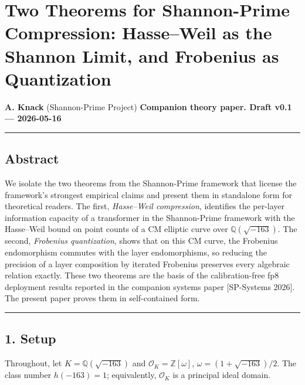 \documentclass[
  11pt,
]{article}
\author{}
\date{}
\begin{document}
\hypertarget{two-theorems-for-shannon-prime-compression-hasseweil-as-the-shannon-limit-and-frobenius-as-quantization}{%
\section{Two Theorems for Shannon-Prime Compression: Hasse--Weil as the
Shannon Limit, and Frobenius as
Quantization}\label{two-theorems-for-shannon-prime-compression-hasseweil-as-the-shannon-limit-and-frobenius-as-quantization}}

\textbf{A. Knack} (Shannon-Prime Project) \textbf{Companion theory
paper. Draft v0.1 --- 2026-05-16}

\begin{center}\rule{0.5\linewidth}{0.5pt}\end{center}

\hypertarget{abstract}{%
\subsection{Abstract}\label{abstract}}

We isolate the two theorems from the Shannon-Prime framework that
license the framework's strongest empirical claims and present them in
standalone form for theoretical readers. The first, \emph{Hasse--Weil
compression}, identifies the per-layer information capacity of a
transformer in the Shannon-Prime framework with the Hasse--Weil bound on
point counts of a CM elliptic curve over \(\mathbb{Q}(\sqrt{-163})\).
The second, \emph{Frobenius quantization}, shows that on this CM curve,
the Frobenius endomorphism commutes with the layer endomorphisms, so
reducing the precision of a layer composition by iterated Frobenius
preserves every algebraic relation exactly. These two theorems are the
basis of the calibration-free fp8 deployment results reported in the
companion systems paper {[}SP-Systems 2026{]}. The present paper proves
them in self-contained form.

\begin{center}\rule{0.5\linewidth}{0.5pt}\end{center}

\hypertarget{setup}{%
\subsection{1. Setup}\label{setup}}

Throughout, let \(K = \mathbb{Q}(\sqrt{-163})\) and
\(\mathcal{O}_K = \mathbb{Z}[\omega]\),
\(\omega = (1 + \sqrt{-163})/2\). The class number \(h(-163) = 1\);
equivalently, \(\mathcal{O}_K\) is a principal ideal domain.
\end{document}
